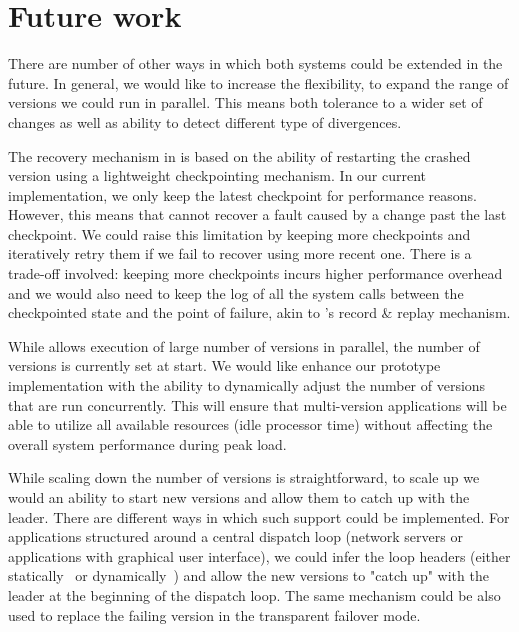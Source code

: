 \section{Future work}
\label{sec:future-work}

There are number of other ways in which both systems could be extended in the
future. In general, we would like to increase the flexibility, to expand the
range of versions we could run in parallel. This means both tolerance to a
wider set of changes as well as ability to detect different type of
divergences.

The recovery mechanism in \mx is based on the ability of restarting the crashed
version using a lightweight checkpointing mechanism. In our current
implementation, we only keep the latest checkpoint for performance reasons.
However, this means that \mx cannot recover a fault caused by a change past the
last checkpoint. We could raise this limitation by keeping more checkpoints and
iteratively retry them if we fail to recover using more recent one. There is a
trade-off involved: keeping more checkpoints incurs higher performance overhead
and we would also need to keep the log of all the system calls between the
checkpointed state and the point of failure, akin to \varan's record \& replay
mechanism.

While \varan allows execution of large number of versions in parallel, the
number of versions is currently set at start. We would like enhance our
prototype implementation with the ability to dynamically adjust the number of
versions that are run concurrently. This will ensure that multi-version
applications will be able to utilize all available resources (\ie idle
processor time) without affecting the overall system performance during peak
load.

While scaling down the number of versions is straightforward, to scale up we
would an ability to start new versions and allow them to catch up with the
leader. There are different ways in which such support could be implemented. For
applications structured around a central dispatch loop (\eg network servers or
applications with graphical user interface), we could infer the loop headers
(either statically~\cite{DJgraphs,havlak} or dynamically~\cite{sato11}) and
allow the new versions to "catch up" with the leader at the beginning of the
dispatch loop. The same mechanism could be also used to replace the failing
version in the transparent failover mode.


